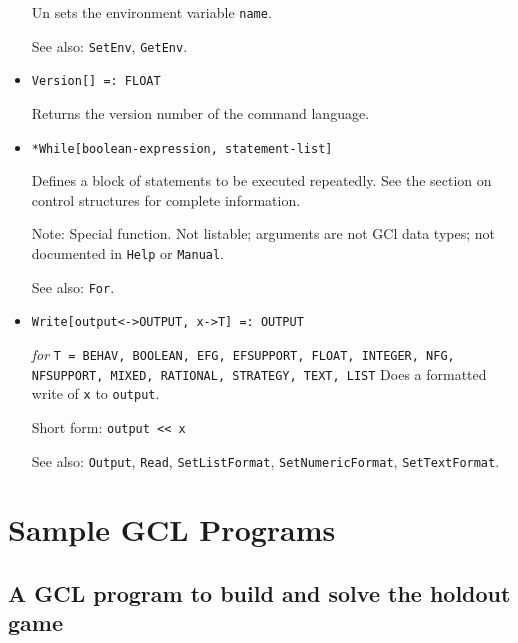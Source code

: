 \begin{itemize}
\bd
Un sets the environment variable \verb+name+.
\item [See also:] \verb+SetEnv+, \verb+GetEnv+.
\ed


\item
\protect \large \begin{verbatim}
Version[] =: FLOAT
\end{verbatim} \normalsize

\bd
Returns the version number of the command language.
\ed


\item 
\protect \large \begin{verbatim}
*While[boolean-expression, statement-list]
\end{verbatim} \normalsize
  
\bd
Defines a block of statements to be executed repeatedly.
See the section on control structures for complete information.
\item [Note:] Special function.  Not listable; arguments are not GCl
data types; not documented in \verb+Help+ or \verb+Manual+.  
\item
[See also:] \verb+For+.
\ed

\item
\protect \large \begin{verbatim}
Write[output<->OUTPUT, x->T] =: OUTPUT  
\end{verbatim}\normalsize

{\it for} {\tt T = BEHAV, BOOLEAN, EFG, EFSUPPORT, FLOAT, INTEGER,
NFG, NFSUPPORT, MIXED, RATIONAL, STRATEGY, TEXT, LIST}
\bd
Does a formatted write of \verb+x+ to \verb+output+.
\item [Short form:] \verb+output << x+
\item [See also:] \verb+Output+, \verb+Read+, \verb+SetListFormat+,
\verb+SetNumericFormat+, \verb+SetTextFormat+.
\ed




\end{itemize}

\newpage
\section{Sample GCL Programs}

\subsection{A GCL program to build and solve the holdout game}


